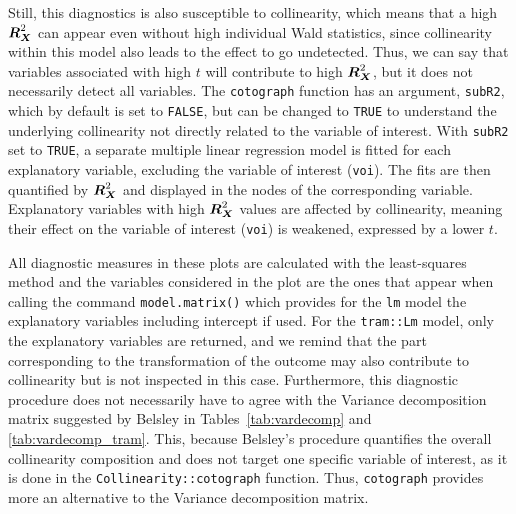 \documentclass[11pt,a4paper,twoside]{book}\usepackage[]{graphicx}\usepackage[]{xcolor}
\begin{document}
Still, this diagnostics is also susceptible to collinearity, which means that a high ${\boldsymbol{R}}_{\boldsymbol{X}}^2$ can appear even without high individual Wald statistics, since collinearity within this model also leads to the effect to go undetected. 
Thus, we can say that variables associated with high $t$ will contribute to  high ${\boldsymbol{R}}_{\boldsymbol{X}}^2$, but it does not necessarily detect all variables.
The \texttt{cotograph} function has an argument, \texttt{subR2}, which by default is set to \texttt{FALSE}, but can be changed to \texttt{TRUE} to understand the underlying collinearity not directly related to the variable of interest. With \texttt{subR2} set to \texttt{TRUE}, a separate multiple linear regression model is fitted for each explanatory variable, excluding the variable of interest (\texttt{voi}). The fits are then quantified by ${\boldsymbol{R}}_{\boldsymbol{X}}^2$ and displayed in the nodes of the corresponding variable. Explanatory variables with high ${\boldsymbol{R}}_{\boldsymbol{X}}^2$ values are affected by collinearity, meaning their effect on the variable of interest (\texttt{voi}) is weakened, expressed by a lower $t$.

All diagnostic measures in these plots are calculated with the least-squares method and the variables considered in the plot are the ones that appear when calling the command \texttt{model.matrix()} which provides for the \texttt{lm} model the explanatory variables including intercept if used. For the \texttt{tram::Lm} model, only the explanatory variables are returned, and we remind that the part corresponding to the transformation of the outcome may also contribute to collinearity but is not inspected in this case.
Furthermore, this diagnostic procedure does not necessarily have to agree with the Variance decomposition matrix suggested by Belsley in Tables~\ref{tab:vardecomp} and \ref{tab:vardecomp_tram}.
This, because Belsley's procedure quantifies the overall collinearity composition and does not target one specific variable of interest, as it is done in the \texttt{Collinearity::cotograph} function.
Thus, \texttt{cotograph} provides more an alternative to the Variance decomposition matrix.
\end{document}
